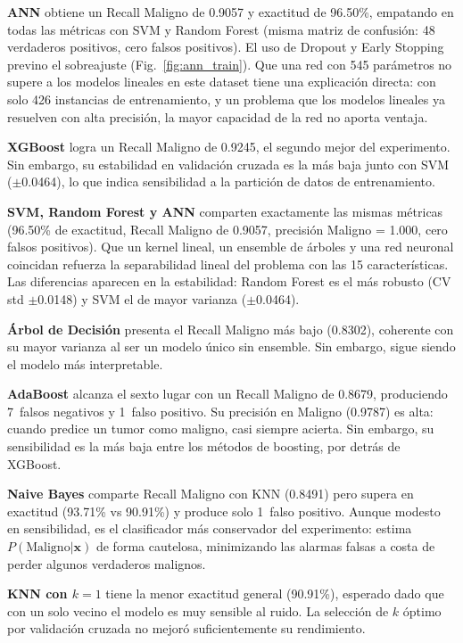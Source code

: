 \documentclass[journal]{IEEEtran}
\begin{document}
\textbf{ANN} obtiene un Recall Maligno de 0.9057 y exactitud de 96.50\%, empatando en todas las métricas con SVM y Random Forest (misma matriz de confusión: 48 verdaderos positivos, cero falsos positivos). El uso de Dropout y Early Stopping previno el sobreajuste (Fig.~\ref{fig:ann_train}). Que una red con 545 parámetros no supere a los modelos lineales en este dataset tiene una explicación directa: con solo 426 instancias de entrenamiento, y un problema que los modelos lineales ya resuelven con alta precisión, la mayor capacidad de la red no aporta ventaja.

\textbf{XGBoost} logra un Recall Maligno de 0.9245, el segundo mejor del experimento. Sin embargo, su estabilidad en validación cruzada es la más baja junto con SVM ($\pm$0.0464), lo que indica sensibilidad a la partición de datos de entrenamiento.

\textbf{SVM, Random Forest y ANN} comparten exactamente las mismas métricas (96.50\% de exactitud, Recall Maligno de 0.9057, precisión Maligno = 1.000, cero falsos positivos). Que un kernel lineal, un ensemble de árboles y una red neuronal coincidan refuerza la separabilidad lineal del problema con las 15 características. Las diferencias aparecen en la estabilidad: Random Forest es el más robusto (CV std $\pm$0.0148) y SVM el de mayor varianza ($\pm$0.0464).

\textbf{Árbol de Decisión} presenta el Recall Maligno más bajo (0.8302), coherente con su mayor varianza al ser un modelo único sin ensemble. Sin embargo, sigue siendo el modelo más interpretable.

\textbf{AdaBoost} alcanza el sexto lugar con un Recall Maligno de 0.8679, produciendo 7~falsos negativos y 1~falso positivo. Su precisión en Maligno (0.9787) es alta: cuando predice un tumor como maligno, casi siempre acierta. Sin embargo, su sensibilidad es la más baja entre los métodos de boosting, por detrás de XGBoost.

\textbf{Naive Bayes} comparte Recall Maligno con KNN (0.8491) pero supera en exactitud (93.71\% vs 90.91\%) y produce solo 1~falso positivo. Aunque modesto en sensibilidad, es el clasificador más conservador del experimento: estima $P(\text{Maligno}|\mathbf{x})$ de forma cautelosa, minimizando las alarmas falsas a costa de perder algunos verdaderos malignos.

\textbf{KNN con $k=1$} tiene la menor exactitud general (90.91\%), esperado dado que con un solo vecino el modelo es muy sensible al ruido. La selección de $k$ óptimo por validación cruzada no mejoró suficientemente su rendimiento.
\end{document}
